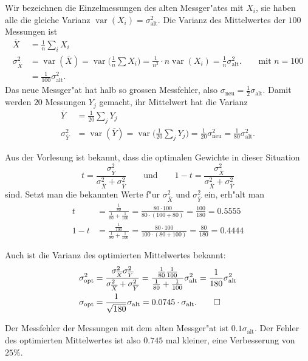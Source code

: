 \begin{loesung}
Wir bezeichnen die Einzelmessungen des alten Messger"ates mit $X_i$, sie
haben alle die gleiche Varianz $\operatorname{var}(X_i)=\sigma_{\text{alt}}^2$.
Die Varianz des Mittelwertes der $100$ Messungen ist
\begin{align*}
\overline X
&=
\frac1n\sum_i X_i
\\
\sigma_{\overline X}^2
&=
\operatorname{var}(\overline X)
=
\operatorname{var}\biggl(\frac1n\sum X_i\biggr)
=
\frac1{n^2}\cdot n\operatorname{var}(X_i)=\frac1n\sigma_{\text{alt}}^2.
\qquad\text{mit $n=100$}
\\
&=\frac1{100}\sigma_{\text{alt}}^2.
\end{align*}
Das neue Messger"at hat halb so grossen Messfehler, also
$\sigma_{\text{neu}}=\frac12\sigma_{\text{alt}}$.
Damit werden $20$ Messungen $Y_j$ gemacht, ihr Mittelwert hat die Varianz
\begin{align*}
\overline Y
&=
\frac1{20}\sum_j Y_j
\\
\sigma_{\overline Y}^2
&=
\operatorname{var}(\overline Y)
=
\operatorname{var}\biggl(\frac1{20}\sum_j Y_j\biggr)
=
\frac1{20}\sigma_{\text{neu}}^2
=
\frac1{80}\sigma_{\text{alt}}^2.
\end{align*}
\begin{teilaufgaben}
\item
Aus der Vorlesung ist bekannt, dass die optimalen Gewichte in dieser
Situation
\[
t
=
\frac{\sigma_{\overline Y}^2}{\sigma_{\overline X}^2 + \sigma_{\overline Y}^2}
\qquad\text{und}\qquad
1-t
=
\frac{\sigma_{\overline X}^2}{\sigma_{\overline X}^2 + \sigma_{\overline Y}^2}
\]
sind.
Setzt man die bekannten Werte f"ur $\sigma_{\overline X}^2$ und
$\sigma_{\overline Y}^2$ ein, erh"alt man
\begin{align*}
t
&=
\frac{\frac1{80}}{\frac1{80}+\frac1{100}}
=
\frac{80\cdot 100}{80\cdot(100+80)}
=
\frac{100}{180}=0.5555
\\
1-t
&=
\frac{\frac1{100}}{\frac1{80}+\frac1{100}}
=
\frac{80\cdot 100}{100\cdot(80+100)}
=
\frac{80}{180}
=
0.4444
\end{align*}
\item
Auch ist die Varianz des optimierten Mittelwertes bekannt:
\begin{align*}
\sigma_{\text{opt}}^2
&=
\frac{\sigma_{\overline X}^2\sigma_{\overline Y}^2}{\sigma_{\overline X}^2 +\sigma_{\overline Y}^2}
=
\frac{\frac1{80}\frac1{100}}{\frac1{80}+\frac1{100}}\sigma_{\text{alt}}^2
=
\frac1{180}\sigma_{\text{alt}}^2
\\
\sigma_{\text{opt}}
&=
\frac1{\sqrt{180}}\sigma_{\text{alt}}
=
0.0745\cdot\sigma_{\text{alt}}.
\qedhere
\end{align*}
\item
Der Messfehler der Messungen mit dem alten Messger"at ist
$0.1\sigma_{\text{alt}}$.
Der Fehler des optimierten Mittelwertes ist also $0.745$ mal kleiner,
eine Verbesserung von $25\%$.
\end{teilaufgaben}
\end{loesung}

\begin{bewertung}
\end{bewertung}


